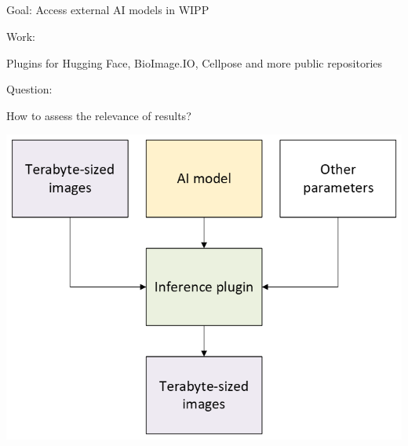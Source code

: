\subsection{\slidetitle}
\begin{frame}
  \frametitle{\sectiontitle}
  \framesubtitle{\slidetitle}

  \begin{minipage}[h!]{0.53\textwidth}
    Goal: Access external AI models in WIPP

    \bigskip

    Work:

    Plugins for Hugging Face, BioImage.IO, Cellpose and more public repositories

    \bigskip

    Question:

    How to assess the relevance of results?

  \end{minipage}\hfill
  \begin{minipage}[h!]{0.46\textwidth}
    \includegraphics[scale=0.55]{./img/2_ai-plugins/inference.png}
  \end{minipage}
\end{frame}

\def\slidetitle{Evaluate results}

